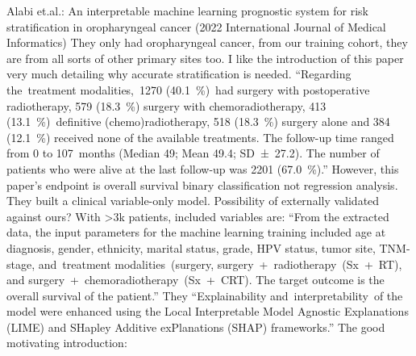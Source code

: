 \documentclass{article}%
\begin{document}
%
Alabi et.al.: An interpretable machine learning prognostic system for risk stratification in oropharyngeal cancer %
\newline%
\newline%
%
(2022 International Journal of Medical Informatics)%
\newline%
\newline%
%
They only had oropharyngeal cancer, from our training cohort, they are from all sorts of other primary sites too. %
\newline%
\newline%
%
I like the introduction of this paper very much detailing why accurate stratification is needed.%
\newline%
\newline%
%
“Regarding the~treatment modalities,~1270 (40.1~\%)~had surgery with postoperative radiotherapy, 579 (18.3~\%) surgery with chemoradiotherapy, 413 (13.1~\%)~definitive (chemo)radiotherapy, 518 (18.3~\%) surgery alone and 384 (12.1~\%) received none of the available treatments. The follow{-}up time ranged from 0 to 107~months (Median 49; Mean 49.4; SD~±~27.2). The number of patients who were alive at the last follow{-}up was 2201 (67.0~\%).”%
\newline%
\newline%
%
However, this paper’s endpoint is overall survival binary classification not regression analysis.%
\newline%
\newline%
%
They built a clinical variable{-}only model. Possibility of externally validated against ours? %
\newline%
\newline%
%
With >3k patients, included variables are: “From the extracted data, the input parameters for the machine learning training included age at diagnosis, gender, ethnicity, marital status, grade, HPV status, tumor site, TNM{-}stage, and~treatment modalities~(surgery, surgery~+~radiotherapy~(Sx~+~RT), and surgery~+~chemoradiotherapy~(Sx~+~CRT). The target outcome is the overall survival of the patient.”%
\newline%
\newline%
%
They “Explainability and~interpretability~of the model were enhanced using the Local Interpretable Model Agnostic Explanations (LIME) and SHapley Additive exPlanations (SHAP) frameworks.”%
\newline%
\newline%
%
The good motivating introduction:%
\newline%
\end{document}
